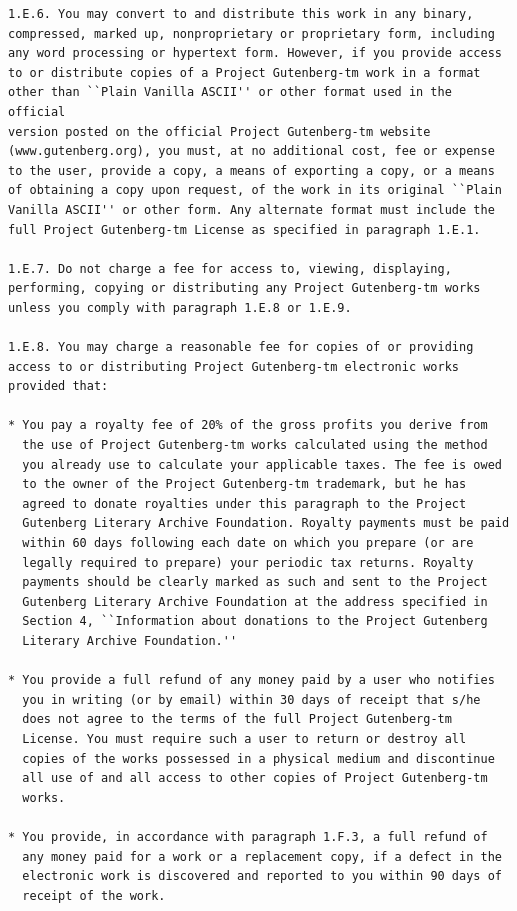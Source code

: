 \documentclass[11pt,oneside]{book}
\begin{document}
\begin{verbatim}
1.E.6. You may convert to and distribute this work in any binary,
compressed, marked up, nonproprietary or proprietary form, including
any word processing or hypertext form. However, if you provide access
to or distribute copies of a Project Gutenberg-tm work in a format
other than ``Plain Vanilla ASCII'' or other format used in the official
version posted on the official Project Gutenberg-tm website
(www.gutenberg.org), you must, at no additional cost, fee or expense
to the user, provide a copy, a means of exporting a copy, or a means
of obtaining a copy upon request, of the work in its original ``Plain
Vanilla ASCII'' or other form. Any alternate format must include the
full Project Gutenberg-tm License as specified in paragraph 1.E.1.

1.E.7. Do not charge a fee for access to, viewing, displaying,
performing, copying or distributing any Project Gutenberg-tm works
unless you comply with paragraph 1.E.8 or 1.E.9.

1.E.8. You may charge a reasonable fee for copies of or providing
access to or distributing Project Gutenberg-tm electronic works
provided that:

* You pay a royalty fee of 20% of the gross profits you derive from
  the use of Project Gutenberg-tm works calculated using the method
  you already use to calculate your applicable taxes. The fee is owed
  to the owner of the Project Gutenberg-tm trademark, but he has
  agreed to donate royalties under this paragraph to the Project
  Gutenberg Literary Archive Foundation. Royalty payments must be paid
  within 60 days following each date on which you prepare (or are
  legally required to prepare) your periodic tax returns. Royalty
  payments should be clearly marked as such and sent to the Project
  Gutenberg Literary Archive Foundation at the address specified in
  Section 4, ``Information about donations to the Project Gutenberg
  Literary Archive Foundation.''

* You provide a full refund of any money paid by a user who notifies
  you in writing (or by email) within 30 days of receipt that s/he
  does not agree to the terms of the full Project Gutenberg-tm
  License. You must require such a user to return or destroy all
  copies of the works possessed in a physical medium and discontinue
  all use of and all access to other copies of Project Gutenberg-tm
  works.

* You provide, in accordance with paragraph 1.F.3, a full refund of
  any money paid for a work or a replacement copy, if a defect in the
  electronic work is discovered and reported to you within 90 days of
  receipt of the work.


\end{verbatim}
\end{document}
